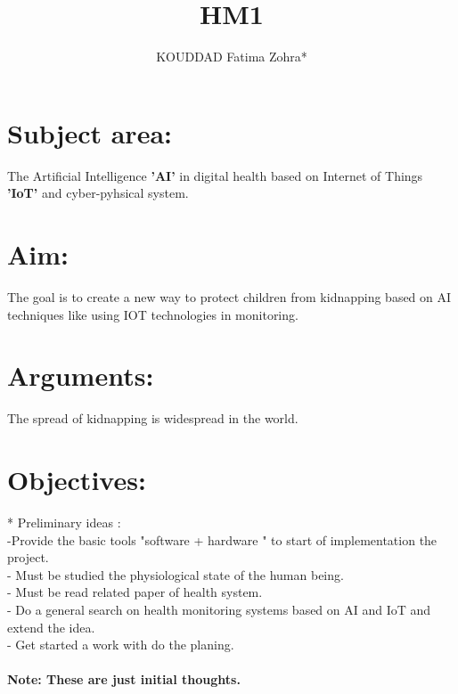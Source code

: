 \documentclass[11pt]{article}
\begin{document}
\title{HM1} 
\author{KOUDDAD Fatima Zohra* } 
\maketitle

\section{Subject area:}
The Artificial Intelligence \textbf{'AI'} in digital health based on Internet of Things \textbf{'IoT'}  and cyber-pyhsical system. \\
\section{Aim:}

 The goal is to create a new way to protect children from kidnapping based on AI techniques like using IOT technologies in monitoring. \\
\section{Arguments:} 
The spread of kidnapping is widespread in the world.
 \\
\section{Objectives:} 
* Preliminary ideas : \\
    -Provide the basic tools "software + hardware " to start of  implementation the project. \\
    - Must be studied the physiological state of the human being. \\
    - Must be read related paper of health system. \\
    - Do a general search on health monitoring systems based on AI and IoT and extend the idea.  \\
    - Get started a work with do the  planing. \\
    \\
\bf Note: These are just initial thoughts.
\end{document}
